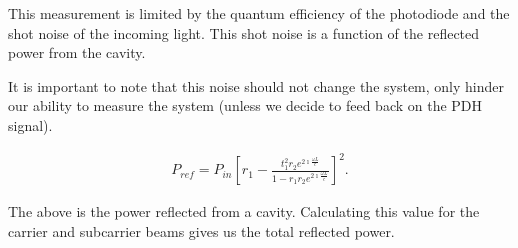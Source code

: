 This measurement is limited by the quantum efficiency of the photodiode and the shot noise of the incoming light.  This shot noise is a function of the reflected power from the cavity.

It is important to note that this noise should not change the system, only hinder our ability to measure the system (unless we decide to feed back on the PDH signal).


\begin{eqnarray}
P_{ref} = P_{in} \left[r_1 - \frac{t_1^2 r_2 e^{2\imath \frac{\omega L}{c}}}{1-r_1 r_2 e^{2\imath \frac{\omega L}{c}}} \right]^2.
\label{eq:refPower}
\end{eqnarray}

The above is the power reflected from a cavity.  Calculating this value for the carrier and subcarrier beams gives us the total reflected power.  
%
%


%
%
%
%

